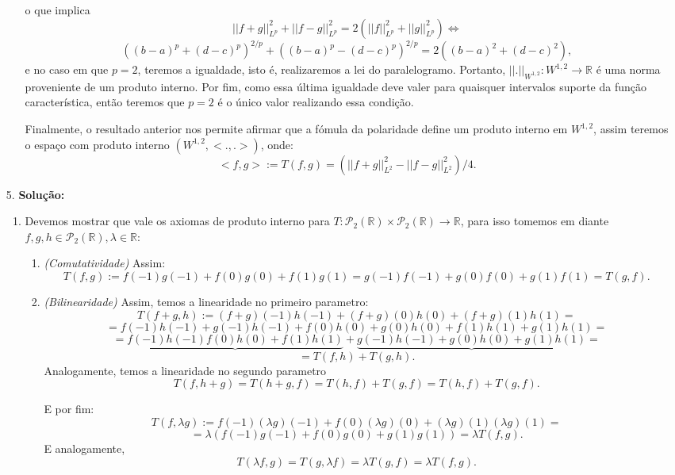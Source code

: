 \documentclass{article}
\begin{document}
\begin{enumerate}
\begin{enumerate}
				o que implica
				$$
				||f +g||_{L^{p}}^{2}+||f -g||_{L^{p}}^{2} =2(||f||_{L^{p}}^{2}+||g||_{L^{p}}^{2}) \iff
				$$
				$$
				((b-a)^{p}+(d-c)^{p})^{2/p}+((b-a)^{p}-(d-c)^{p})^{2/p} = 2((b-a)^{2}+(d-c)^{2}),
				$$
				e no caso em que $p=2$, teremos a igualdade, isto é, realizaremos a lei do paralelogramo. Portanto, $||. ||_{W^{1,2}} : W^{1,2} \to \mathbb{R}$ é uma norma proveniente de um produto interno. Por fim, como essa última igualdade deve valer para quaisquer intervalos suporte da função característica, então teremos que $p=2$ é o único valor realizando essa condição.
				
				Finalmente, o resultado anterior nos permite afirmar que a fómula da polaridade define um produto interno em $W^{1,2}$, assim teremos o espaço com produto interno $(W^{1,2}, <.,.>)$, onde:
				$$
				<f,g> := T(f,g) = (||f +g||_{L^{2}}^{2} - ||f -g||_{L^{2}}^{2})/4.
				$$
			\end{enumerate}
		
		\item[5.] \textbf{Solução:}
			\begin{enumerate}
				\item Devemos mostrar que vale os axiomas de produto interno para $T: \mathcal{P}_{2}(\mathbb{R}) \times \mathcal{P}_{2}(\mathbb{R}) \to \mathbb{R}$, para isso tomemos em diante $f,g,h \in \mathcal{P}_{2}(\mathbb{R}), \lambda \in \mathbb{R}$:
					\begin{enumerate}
						\item \textit{(Comutatividade)} Assim: 
						$$
						T(f, g):= f(-1)g(-1) + f(0)g(0) + f(1)g(1) = g(-1)f(-1) + g(0)f(0) + g(1)f(1) = T(g, f).
						$$
						
						\item \textit{(Bilinearidade)} Assim, temos a linearidade no primeiro parametro: 
						$$
						T(f+g, h) := (f+g)(-1)h(-1) +(f+g)(0)h(0)+(f+g)(1)h(1) =  
						$$
						$$
						= f(-1)h(-1)+g(-1)h(-1) +f(0)h(0)+g(0)h(0)+f(1)h(1)+g(1)h(1)=
						$$ 
						$$
						= \underbrace{f(-1)h(-1)f(0)h(0)+f(1)h(1)}+\underbrace{g(-1)h(-1) +g(0)h(0)+g(1)h(1)}=
						$$
						$$
						= T(f, h) + T(g,h).
						$$
						Analogamente, temos a linearidade no segundo parametro 
						$$
						T(f, h+g) = T(h+g, f) = T(h, f) + T(g, f) = T(h, f) + T(g, f).
						$$
						
						E por fim:
						$$
						T(f, \lambda g):= f(-1)(\lambda g)(-1) + f(0)(\lambda g)(0) + (\lambda g)(1)(\lambda g)(1) =
						$$
						$$
						=\lambda (f(-1)g(-1) + f(0)g(0) + g(1)g(1)) = \lambda T(f, g).
						$$
						E analogamente, 
						$$
						T(\lambda f, g) = T(g, \lambda f) = \lambda T(g,f) = \lambda T(f,g).
						$$
						

\end{enumerate}
\end{enumerate}
\end{enumerate}
\end{document}
